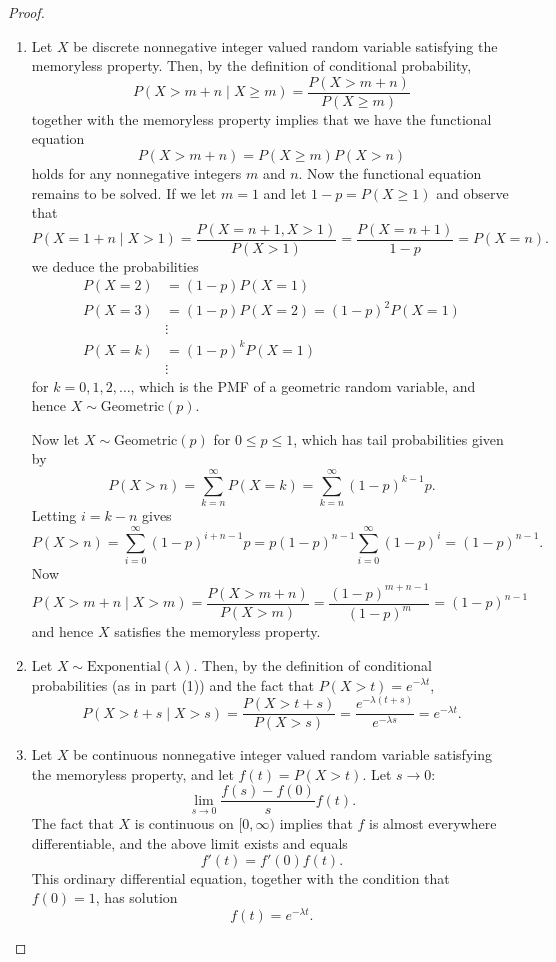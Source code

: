 \documentclass[oneside, a4paper]{amsart}
\newcommand{\Exp}{\mathrm{Exponential}}
\newcommand{\Geom}{\mathrm{Geometric}}
\begin{document}
\begin{proof}
\leavevmode
\begin{enumerate}
\item
Let $X$ be discrete nonnegative integer valued random variable satisfying the memoryless property. Then, by the definition of conditional probability,
\[
	P(X > m + n \mid X \geq m) = \frac{P(X>m + n)}{P(X \geq m)}
\]
together with the memoryless property implies that we have the functional equation
\[
	P(X > m + n) = P(X \geq m)P(X > n)
\] 
holds for any nonnegative integers $m$ and $n$. Now the functional equation remains to be solved. If we let $m=1$ and let $1-p = P(X \geq 1)$ and observe that 
\[
	P(X = 1+n \mid X > 1) =  \frac{P(X  =  n + 1, X > 1)}{P(X > 1)}  = \frac{P(X =n+1)}{1-p}  = P(X = n).
\]
we deduce the probabilities 
\begin{align*}
	P(X=2) &= (1-p) P(X=1) \\
	P(X=3) &= (1-p)P(X=2) = (1-p)^2 P(X=1) \\
	& \vdots \\ 
	P(X=k) &= (1-p)^k P(X=1) \\
	& \vdots 
\end{align*}	
for $k=0,1,2,\dotsc$, which is the PMF of a geometric random variable, and hence $X \sim \Geom(p)$. 
\par
Now let $X \sim \Geom(p)$ for $0 \leq p \leq 1$, which has tail probabilities given by
\[
	P(X > n) = \sum_{k=n}^\infty P(X = k) = \sum_{k=n}^\infty (1 - p)^{k-1} p.
\]
Letting $i=k-n$ gives
\[
	P(X > n) = \sum_{i=0}^\infty (1 - p)^{i+n-1} p = p(1-p)^{n-1} \sum_{i=0}^\infty (1 - p)^i = (1-p)^{n-1}.
\]
Now 
\[
	P(X > m + n \mid X > m)= \frac{P(X>m + n)}{P(X > m)} = \frac{(1-p)^{m+n-1}}{(1-p)^{m}} = (1-p)^{n-1}
\]
and hence $X$ satisfies the memoryless property. 
\item
Let $X \sim \Exp(\lambda)$. Then, by the definition of conditional probabilities (as in part (1)) and the fact that $P(X>t) = e^{-\lambda t}$, 
\[
	P(X> t+s \mid X > s) =  \frac{P(X > t+s)}{P(X > s)} = \frac{e^{-\lambda(t+s)}}{e^{-\lambda s}} = e^{-\lambda t}.
\]
\item
Let $X$ be continuous nonnegative integer valued random variable satisfying the memoryless property, and let $f(t) = P(X > t)$. Let $s \to 0$: 
\[
	\lim_{s \to 0} \frac{f(s) - f(0)}{s} f(t).
\]
The fact that $X$ is continuous on $[0, \infty)$ implies that $f$ is almost everywhere differentiable, and the above limit exists and equals 
\[
	f'(t) = f'(0) f(t).
\]
This ordinary differential equation, together with the condition that $f(0)=1$, has solution
\[
	f(t) = e^{-\lambda t}.
\]
\end{enumerate}
\end{proof}
\end{document}
